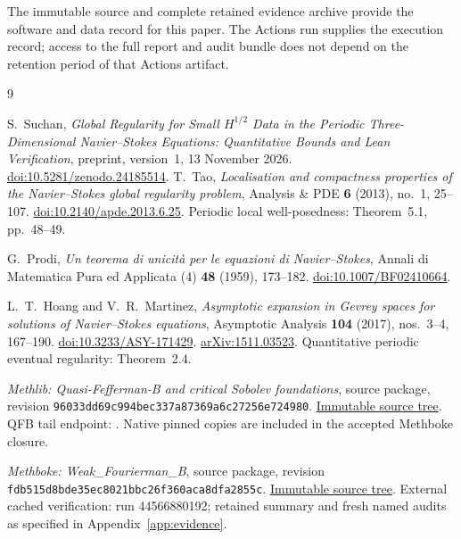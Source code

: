 \documentclass[11pt,a4paper]{article}
\numberwithin{equation}{section}
\theoremstyle{plain}
\theoremstyle{definition}
\theoremstyle{remark}
\newcommand{\decl}[1]{\begingroup\small\nolinkurl{#1}\endgroup}
\begin{document}
The immutable source and complete retained evidence archive provide
the software and data record for this paper. The Actions run supplies
the execution record; access to the full report and audit bundle does
not depend on the retention period of that Actions artifact.

\begin{thebibliography}{9}
\small\raggedright
{}
S.~Suchan, \emph{Global Regularity for Small $H^{1/2}$ Data in the Periodic
Three-Dimensional Navier--Stokes Equations: Quantitative Bounds and Lean
Verification}, preprint, version~1, 13 November 2026.
\href{https://doi.org/10.5281/zenodo.24185514}{doi:10.5281/zenodo.24185514}.
T.~Tao, \emph{Localisation and compactness properties of the Navier--Stokes
global regularity problem}, Analysis \& PDE \textbf{6} (2013), no.~1,
25--107. \href{https://doi.org/10.2140/apde.2013.6.25}{doi:10.2140/apde.2013.6.25}.
Periodic local well-posedness: Theorem~5.1, pp.~48--49.

G.~Prodi, \emph{Un teorema di unicit\`a per le equazioni di Navier--Stokes},
Annali di Matematica Pura ed Applicata (4) \textbf{48} (1959), 173--182.
\href{https://doi.org/10.1007/BF02410664}{doi:10.1007/BF02410664}.

L.~T.~Hoang and V.~R.~Martinez, \emph{Asymptotic expansion in Gevrey spaces
for solutions of Navier--Stokes equations}, Asymptotic Analysis
\textbf{104} (2017), nos.~3--4, 167--190.
\href{https://doi.org/10.3233/ASY-171429}{doi:10.3233/ASY-171429}.
\href{https://arxiv.org/abs/1511.03523}{arXiv:1511.03523}.
Quantitative periodic eventual regularity: Theorem~2.4.

\emph{Methlib: Quasi-Fefferman-B and critical Sobolev foundations}, source
package, revision
\decl{96033dd69c994bec337a87369a6c27256e724980}.
\href{https://github.com/randogelist/Methlib/tree/96033dd69c994bec337a87369a6c27256e724980}{Immutable source tree}.
QFB tail endpoint: .
Native pinned copies are included in the accepted Methboke closure.

\emph{Methboke: Weak\_Fourierman\_B}, source package, revision
\decl{fdb515d8bde35ec8021bbc26f360aca8dfa2855c}.
\href{https://github.com/randogelist/Methboke/tree/fdb515d8bde35ec8021bbc26f360aca8dfa2855c}{Immutable source tree}.
External cached verification: run 44566880192; retained summary and
fresh named audits as specified in Appendix~\ref{app:evidence}.
\end{thebibliography}
\end{document}
